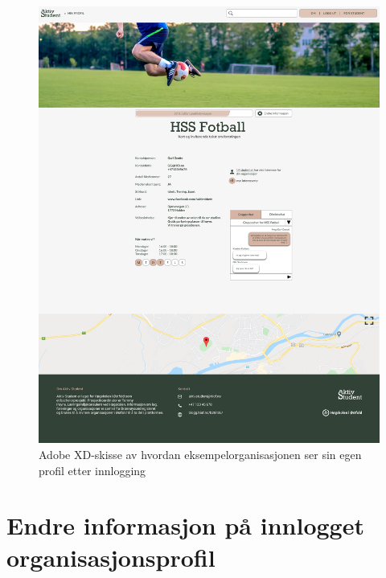 \begin{figure}[H]
\centering
\includegraphics[width=\textwidth]{Illustrasjoner/Skisser-pdf/3.0/3-17-innlogget-organisasjon.pdf}
\caption{Adobe XD-skisse av hvordan eksempelorganisasjonen ser sin egen profil etter innlogging}
\label{vedlegg:3-17-innlogget-org}
\end{figure}

\section{Endre informasjon på innlogget organisasjonsprofil}

